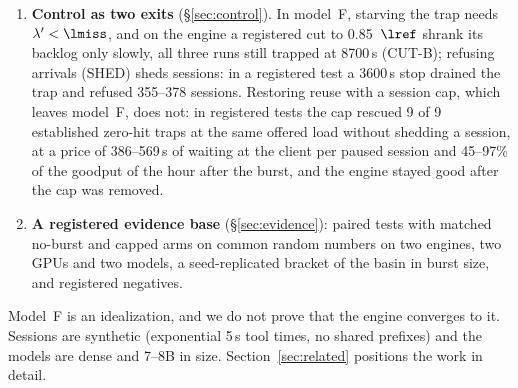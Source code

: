 \begin{enumerate}[label=(\arabic*),leftmargin=*]
\item \textbf{Control as two exits} (\S\ref{sec:control}). In model~F, starving the trap needs $\lambda'<\lmiss$, and on the engine a
registered cut to 0.85~$\lref$ shrank its backlog only slowly, all three runs still trapped at 8700\,s (CUT-B); refusing arrivals (SHED) sheds sessions: in a registered test a 3600\,s stop drained the trap and refused 355--378 sessions. Restoring reuse with a
session cap, which leaves model~F, does not: in registered tests the cap rescued 9 of 9 established zero-hit traps at the same
offered load without shedding a session, at a price of 386--569\,s of waiting at the client per paused session and 45--97\% of the
goodput of the hour after the burst, and the engine stayed good after the cap was removed.
\item \textbf{A registered evidence base} (\S\ref{sec:evidence}): paired tests with matched no-burst and capped arms on common random
numbers on two engines, two GPUs and two models, a seed-replicated bracket of the basin in burst size, and registered negatives.
\end{enumerate}

\noindent Model~F is an idealization, and we do not prove that the engine converges to it. Sessions are synthetic (exponential
5\,s tool times, no shared prefixes) and the models are dense and 7--8B in size. Section~\ref{sec:related} positions the work in
detail.
